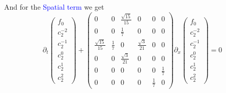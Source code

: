\begin{frame}
	\scriptsize
	And for the \textcolor{blue}{Spatial term} we get
		$$
	\partial_t \left(\begin{array}{c}
		f_0 \\
		c_2^{-2} \\
		c_2^{-1} \\
		c_2^0 \\
		c_2^1 \\
		c_2^2
	\end{array}\right) + \begin{pmatrix}
		0 & 0 & \frac{\sqrt{15}}{15} & 0 & 0 & 0 \\
		0 & 0 & \frac{1}{7} & 0 & 0 & 0 \\
		\frac{\sqrt{15}}{15} & \frac{1}{7} & 0 & \frac{\sqrt{3}}{21} & 0 &  0 \\
		0 & 0 & \frac{\sqrt{3}}{21} & 0 & 0 & 0 \\
		0 & 0 & 0 & 0 & 0 & \frac{1}{7}\\
		0 & 0 & 0 & 0 & \frac{1}{7} & 0
	\end{pmatrix} \partial_x \left(\begin{array}{c}
		f_0 \\
		c_2^{-2} \\
		c_2^{-1} \\
		c_2^0 \\
		c_2^1 \\
		c_2^2
	\end{array}\right) = 0
	$$
\end{frame}